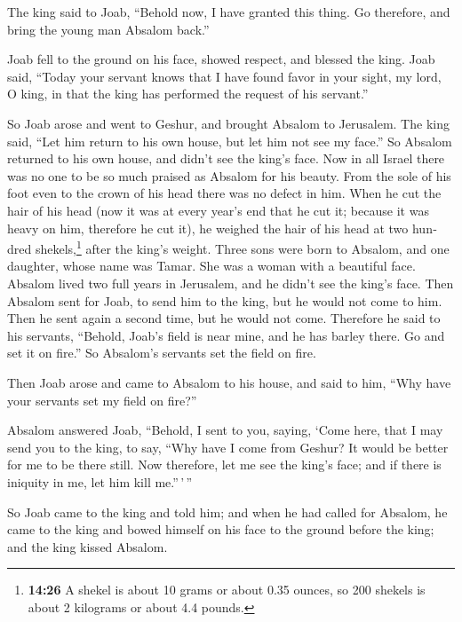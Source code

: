 \begin{paracol}{2}
\begin{otherlanguage}{english}
 The king said to Joab, ``Behold now, I have granted this
thing. Go therefore, and bring the young man Absalom back.''

 Joab fell to the ground on his face, showed respect, and
blessed the king. Joab said, ``Today your servant knows that I have
found favor in your sight, my lord, O king, in that the king has
performed the request of his servant.''

 So Joab arose and went to Geshur, and brought Absalom to
Jerusalem.  The king said, ``Let him return to his own
house, but let him not see my face.'' So Absalom returned to his own
house, and didn't see the king's face.  Now in all Israel
there was no one to be so much praised as Absalom for his beauty. From
the sole of his foot even to the crown of his head there was no defect
in him.  When he cut the hair of his head (now it was at
every year's end that he cut it; because it was heavy on him, therefore
he cut it), he weighed the hair of his head at two hundred
shekels,\footnote{\textbf{14:26} A shekel is about 10 grams or about
  0.35 ounces, so 200 shekels is about 2 kilograms or about 4.4 pounds.}
after the king's weight.  Three sons were born to
Absalom, and one daughter, whose name was Tamar. She was a woman with a
beautiful face.  Absalom lived two full years in
Jerusalem, and he didn't see the king's face.  Then
Absalom sent for Joab, to send him to the king, but he would not come to
him. Then he sent again a second time, but he would not come.
 Therefore he said to his servants, ``Behold, Joab's
field is near mine, and he has barley there. Go and set it on fire.'' So
Absalom's servants set the field on fire.

 Then Joab arose and came to Absalom to his house, and
said to him, ``Why have your servants set my field on fire?''

 Absalom answered Joab, ``Behold, I sent to you, saying,
`Come here, that I may send you to the king, to say, ``Why have I come
from Geshur? It would be better for me to be there still. Now therefore,
let me see the king's face; and if there is iniquity in me, let him kill
me.''\,'\,''

 So Joab came to the king and told him; and when he had
called for Absalom, he came to the king and bowed himself on his face to
the ground before the king; and the king kissed Absalom.


\end{otherlanguage}
\end{paracol}
